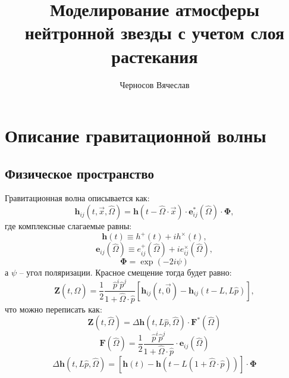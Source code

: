 
\author{Черносов Вячеслав}
\title{Моделирование атмосферы нейтронной звезды с учетом слоя растекания}


\maketitle
\section{Описание гравитационной волны}
\subsection{Физическое пространство}
Гравитационная волна описывается как:
$$\mathbf{h}_{ij}(t, \vec{x}, \hat{\Omega}) = \mathbf{h}(t - \hat{\Omega} \cdot \vec{x}) \cdot \mathbf{e}^{*}_{ij}(\hat{\Omega}) \cdot \mathbf{\Phi},$$
где комплексные слагаемые равны:
$$\mathbf{h}(t) \equiv h^{+}(t) + i h^{\times}(t), $$
$$\mathbf{e}_{ij}(\hat{\Omega}) \equiv {e}_{ij}^{+}(\hat{\Omega}) + i {e}_{ij}^{\times}(\hat{\Omega}),$$
$$\mathbf{\Phi} = \exp(-2i\psi)$$
а $\psi$ -- угол поляризации.
Красное смещение тогда будет равно:
$$\mathbf{Z}(t, \hat{\Omega}) = \frac{1}{2} \frac{\hat{p}^i \hat{p}^j}{1 + \hat{\Omega} \cdot \hat{p}} \left[\mathbf{h}_{ij}(t, \vec{0}) - \mathbf{h}_{ij}(t - L, L\hat{p})\right],$$
что можно переписать как:
$$\mathbf{Z}(t, \hat{\Omega}) = \Delta \mathbf{h}(t, L\hat{p}, \hat{\Omega}) \cdot \mathbf{F}^{*}(\hat{\Omega})$$
$$\mathbf{F}(\hat{\Omega}) = \frac{1}{2} \frac{\hat{p}^i \hat{p}^j}{1 + \hat{\Omega} \cdot  \hat{p}} \cdot \mathbf{e}_{ij}(\hat{\Omega}) $$
$$\Delta \mathbf{h}(t, L\hat{p},  \hat{\Omega}) = \left[ \mathbf{h}(t) - \mathbf{h}(t - L (1 + \hat{\Omega} \cdot \hat{p})) \right] \cdot \mathbf{\Phi}$$

